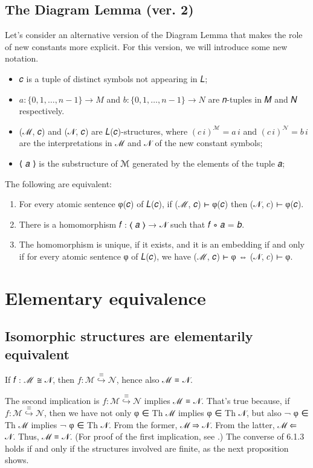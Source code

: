 \documentclass[a4paper,UKenglish,cleveref,autoref,thm-restate,12pt]{lipics-v2021-wjd}
\newcommand{\<}{\langle}
\renewcommand{\>}{\rangle}
\begin{document}
\subsection{The Diagram Lemma (ver. 2)}\label{the-diagram-lemma-ver.-2}
Let's consider an alternative version of the Diagram Lemma that makes the role
of new constants more explicit. For this version, we will introduce some 
new notation.

\begin{itemize}
\item 𝑐 is a tuple of distinct symbols not appearing in 𝐿;
\item \(𝑎 : \{0, 1, …, 𝑛-1\} → 𝑀\) and \(𝑏 : \{0, 1, …, 𝑛-1\} → 𝑁\) are 𝑛-tuples in 𝑀 and 𝑁 respectively.
\item (ℳ, 𝑐) and (𝒩, 𝑐) are 𝐿(𝑐)-structures, where \((𝑐 \,i)^ℳ = 𝑎 \, i\) and
  \((𝑐\, i)^𝒩 = 𝑏\, i\) are the interpretations in ℳ and 𝒩 of the new constant
  symbols;
\item
  ⟨ 𝑎 ⟩ is the substructure of ℳ generated by the elements of the tuple 𝑎;
\end{itemize}

\begin{lemma} The following are equivalent:
  \begin{enumerate}
  \item For every atomic sentence φ(𝑐) of 𝐿(𝑐), if (ℳ, 𝑐) ⊢ φ(𝑐) then (𝒩, 𝑐) ⊢ φ(𝑐). 
  \item There is a homomorphism 𝑓 : ⟨ 𝑎 ⟩ → 𝒩 such that 𝑓 ∘ 𝑎 = 𝑏.
  \item The homomorphism is unique, if it exists, and it is an embedding if and
    only if for every atomic sentence φ of 𝐿(𝑐), we have (ℳ, 𝑐) ⊢ φ  ⇔ (𝒩, 𝑐) ⊢ φ.
  \end{enumerate}
\end{lemma}

\section{Elementary equivalence}\label{elementary-equivalence}
\subsection{Isomorphic structures are elementarily equivalent}\label{isomorphic-structures-are-elementarily-equivalent}
\begin{lemma}
If 𝑓 : ℳ ≅ 𝒩, then \(𝑓 : ℳ \stackrel{≡}{↪} 𝒩\), hence also ℳ ≡ 𝒩.
\end{lemma}
The second implication is \(𝑓 : ℳ \stackrel{≡}{↪} 𝒩\) implies ℳ ≡ 𝒩. 
That's true because, if \(𝑓 : ℳ \stackrel{≡}{↪} 𝒩\), then we have not only
φ ∈ Th ℳ implies φ ∈ Th 𝒩, but also ¬ φ ∈ Th ℳ implies ¬ φ ∈ Th 𝒩. From the
former, ℳ ⇒ 𝒩. From the latter, ℳ ⇐ 𝒩. Thus, ℳ ≡ 𝒩.
(For proof of the first implication, see \cite[page 70]{Rothmaler:2000}.)
The converse of 6.1.3 holds if and only if the structures involved are
finite, as the next proposition shows.
\end{document}
